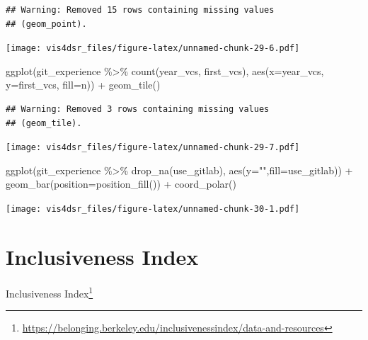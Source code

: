 \documentclass[
]{krantz}
\makeatletter
\newenvironment{Shaded}{\begin{snugshade}}{\end{snugshade}}
\newcommand{\AttributeTok}[1]{\textcolor[rgb]{0.61,0.61,0.61}{#1}}
\newcommand{\FunctionTok}[1]{\textcolor[rgb]{0,0,0}{#1}}
\newcommand{\NormalTok}[1]{#1}
\newcommand{\SpecialCharTok}[1]{\textcolor[rgb]{0,0,0}{#1}}
\newcommand{\StringTok}[1]{\textcolor[rgb]{0.5,0.5,0.5}{#1}}
\renewcommand{\href}[2]{#2\footnote{\url{#1}}}
\newenvironment{kframe}{%
\medskip{}
\setlength{\fboxsep}{.8em}
 \def\at@end@of@kframe{}%
 \ifinner\ifhmode%
  \def\at@end@of@kframe{\end{minipage}}%
  \begin{minipage}{\columnwidth}%
 \fi\fi%
 \def\FrameCommand##1{\hskip\@totalleftmargin \hskip-\fboxsep
 \colorbox{shadecolor}{##1}\hskip-\fboxsep
     \hskip-\linewidth \hskip-\@totalleftmargin \hskip\columnwidth}%
 \MakeFramed {\advance\hsize-\width
   \@totalleftmargin\z@ \linewidth\hsize
   \@setminipage}}%
 {\par\unskip\endMakeFramed%
 \at@end@of@kframe}
\renewenvironment{Shaded}{\begin{kframe}}{\end{kframe}}
\makeatother
\begin{document}
\begin{verbatim}
## Warning: Removed 15 rows containing missing values
## (geom_point).
\end{verbatim}

\texttt{[image: vis4dsr\_files/figure-latex/unnamed-chunk-29-6.pdf]}

\begin{Shaded}
\begin{Highlighting}[]
\FunctionTok{ggplot}\NormalTok{(git\_experience }\SpecialCharTok{\%\textgreater{}\%} \FunctionTok{count}\NormalTok{(year\_vcs, first\_vcs), }
       \FunctionTok{aes}\NormalTok{(}\AttributeTok{x=}\NormalTok{year\_vcs, }\AttributeTok{y=}\NormalTok{first\_vcs, }\AttributeTok{fill=}\NormalTok{n)) }\SpecialCharTok{+}
  \FunctionTok{geom\_tile}\NormalTok{()}
\end{Highlighting}
\end{Shaded}

\begin{verbatim}
## Warning: Removed 3 rows containing missing values
## (geom_tile).
\end{verbatim}

\texttt{[image: vis4dsr\_files/figure-latex/unnamed-chunk-29-7.pdf]}

\begin{Shaded}
\begin{Highlighting}[]
\FunctionTok{ggplot}\NormalTok{(git\_experience }\SpecialCharTok{\%\textgreater{}\%} \FunctionTok{drop\_na}\NormalTok{(use\_gitlab), }\FunctionTok{aes}\NormalTok{(}\AttributeTok{y=}\StringTok{""}\NormalTok{,}\AttributeTok{fill=}\NormalTok{use\_gitlab)) }\SpecialCharTok{+}
  \FunctionTok{geom\_bar}\NormalTok{(}\AttributeTok{position=}\FunctionTok{position\_fill}\NormalTok{()) }\SpecialCharTok{+}
  \FunctionTok{coord\_polar}\NormalTok{()}
\end{Highlighting}
\end{Shaded}

\texttt{[image: vis4dsr\_files/figure-latex/unnamed-chunk-30-1.pdf]}

\hypertarget{inclusiveness-index}{%
\section*{Inclusiveness Index}\label{inclusiveness-index}}


\href{https://belonging.berkeley.edu/inclusivenessindex/data-and-resources}{Inclusiveness Index}
\end{document}
